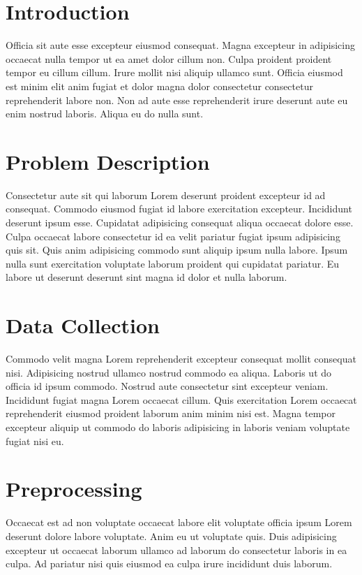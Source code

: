 \section{Introduction}

Officia sit aute esse excepteur eiusmod consequat. Magna excepteur in adipisicing occaecat nulla tempor ut ea amet dolor cillum non. Culpa proident proident tempor eu cillum cillum. Irure mollit nisi aliquip ullamco sunt. Officia eiusmod est minim elit anim fugiat et dolor magna dolor consectetur consectetur reprehenderit labore non. Non ad aute esse reprehenderit irure deserunt aute eu enim nostrud laboris. Aliqua eu do nulla sunt.


\section{Problem Description}

Consectetur aute sit qui laborum Lorem deserunt proident excepteur id ad consequat. Commodo eiusmod fugiat id labore exercitation excepteur. Incididunt deserunt ipsum esse. Cupidatat adipisicing consequat aliqua occaecat dolore esse. Culpa occaecat labore consectetur id ea velit pariatur fugiat ipsum adipisicing quis sit. Quis anim adipisicing commodo sunt aliquip ipsum nulla labore. Ipsum nulla sunt exercitation voluptate laborum proident qui cupidatat pariatur. Eu labore ut deserunt deserunt sint magna id dolor et nulla laborum.

\section{Data Collection}

Commodo velit magna Lorem reprehenderit excepteur consequat mollit consequat nisi. Adipisicing nostrud ullamco nostrud commodo ea aliqua. Laboris ut do officia id ipsum commodo. Nostrud aute consectetur sint excepteur veniam. Incididunt fugiat magna Lorem occaecat cillum. Quis exercitation Lorem occaecat reprehenderit eiusmod proident laborum anim minim nisi est. Magna tempor excepteur aliquip ut commodo do laboris adipisicing in laboris veniam voluptate fugiat nisi eu.

\section{Preprocessing}

Occaecat est ad non voluptate occaecat labore elit voluptate officia ipsum Lorem deserunt dolore labore voluptate. Anim eu ut voluptate quis. Duis adipisicing excepteur ut occaecat laborum ullamco ad laborum do consectetur laboris in ea culpa. Ad pariatur nisi quis eiusmod ea culpa irure incididunt duis laborum.

